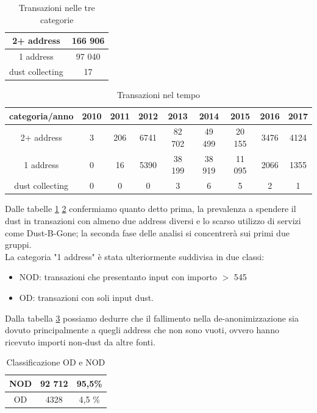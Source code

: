 \begin{table}[H]
    \centering
    \begin{tabular}{|c|c|}
        \hline
        2+ address & 166 906\\
        \hline
        1 address & 97 040\\
        \hline
        dust collecting & 17\\
        \hline
    \end{tabular}
    \caption{Transazioni nelle tre categorie}
    \label{tab:tx_categories}
\end{table}
\begin{table}[H]
    \centering
    \begin{tabular}{|c|c|c|c|c|c|c|c|c|}
        \hline
            categoria/anno  & 2010 & 2011 & 2012 & 2013 & 2014 & 2015 & 2016 & 2017\\
        \hline 
         2+ address &  3 & 206 & 6741 & 82 702 & 49 499 & 20 155 & 3476 & 4124 \\
         \hline
         1 address & 0 & 16 & 5390 & 38 199 & 38 919 & 11 095 & 2066 & 1355  \\
         \hline
         dust collecting & 0 & 0 & 0 & 3 & 6 & 5 & 2 & 1 \\
         \hline
    \end{tabular}
    \caption{Transazioni nel tempo}
    \label{tab:tx_categories_year}
\end{table}
Dalle tabelle \ref{tab:tx_categories} \ref{tab:tx_categories_year} confermiamo quanto detto prima, la prevalenza a spendere il dust in transazioni con almeno due address diversi e lo scarso utilizzo di servizi come Dust-B-Gone; la seconda fase delle analisi si concentrerà sui primi due gruppi.\\
La categoria "1 address" è stata ulteriormente suddivisa in due classi:
\begin{itemize}
    \item NOD: transazioni che presentanto input con importo $>$ 545  
    \item OD: transazioni con soli input dust.
\end{itemize}
Dalla tabella \ref{tab:OD_NOD_failed} possiamo dedurre che il fallimento nella de-anonimizzazione sia dovuto principalmente a quegli address che non sono vuoti, ovvero hanno ricevuto importi non-dust da altre fonti. 
\begin{table}[H]
    \centering
    \begin{tabular}{|c|c|c|}
        \hline
            NOD  & 92 712 & 95,5\%\\
        \hline 
            OD  & 4328 & 4,5 \%\\
        \hline
    \end{tabular}
    \caption{Classificazione OD e NOD}
    \label{tab:OD_NOD_failed}
\end{table}
